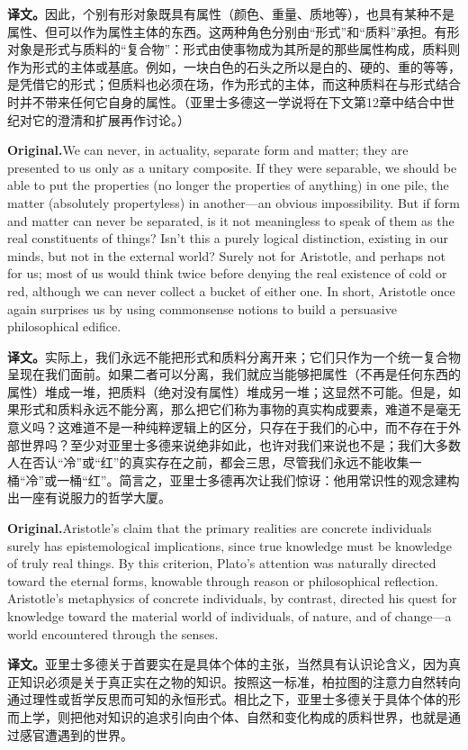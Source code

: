 \documentclass[UTF8]{ctexart}
\newcommand{\orig}{\par\noindent\textbf{Original.}\quad}
\newcommand{\zh}{\par\noindent\textbf{译文。}\quad}
\begin{document}
\zh 因此，个别有形对象既具有属性（颜色、重量、质地等），也具有某种不是属性、但可以作为属性主体的东西。这两种角色分别由“形式”和“质料”承担。有形对象是形式与质料的“复合物”：形式由使事物成为其所是的那些属性构成，质料则作为形式的主体或基底。例如，一块白色的石头之所以是白的、硬的、重的等等，是凭借它的形式；但质料也必须在场，作为形式的主体，而这种质料在与形式结合时并不带来任何它自身的属性。（亚里士多德这一学说将在下文第12章中结合中世纪对它的澄清和扩展再作讨论。）

\orig We can never, in actuality, separate form and matter; they are presented to us only as a unitary composite. If they were separable, we should be able to put the properties (no longer the properties of anything) in one pile, the matter (absolutely propertyless) in another---an obvious impossibility. But if form and matter can never be separated, is it not meaningless to speak of them as the real constituents of things? Isn't this a purely logical distinction, existing in our minds, but not in the external world? Surely not for Aristotle, and perhaps not for us; most of us would think twice before denying the real existence of cold or red, although we can never collect a bucket of either one. In short, Aristotle once again surprises us by using commonsense notions to build a persuasive philosophical edifice.

\zh 实际上，我们永远不能把形式和质料分离开来；它们只作为一个统一复合物呈现在我们面前。如果二者可以分离，我们就应当能够把属性（不再是任何东西的属性）堆成一堆，把质料（绝对没有属性）堆成另一堆；这显然不可能。但是，如果形式和质料永远不能分离，那么把它们称为事物的真实构成要素，难道不是毫无意义吗？这难道不是一种纯粹逻辑上的区分，只存在于我们的心中，而不存在于外部世界吗？至少对亚里士多德来说绝非如此，也许对我们来说也不是；我们大多数人在否认“冷”或“红”的真实存在之前，都会三思，尽管我们永远不能收集一桶“冷”或一桶“红”。简言之，亚里士多德再次让我们惊讶：他用常识性的观念建构出一座有说服力的哲学大厦。

\orig Aristotle's claim that the primary realities are concrete individuals surely has epistemological implications, since true knowledge must be knowledge of truly real things. By this criterion, Plato's attention was naturally directed toward the eternal forms, knowable through reason or philosophical reflection. Aristotle's metaphysics of concrete individuals, by contrast, directed his quest for knowledge toward the material world of individuals, of nature, and of change---a world encountered through the senses.

\zh 亚里士多德关于首要实在是具体个体的主张，当然具有认识论含义，因为真正知识必须是关于真正实在之物的知识。按照这一标准，柏拉图的注意力自然转向通过理性或哲学反思而可知的永恒形式。相比之下，亚里士多德关于具体个体的形而上学，则把他对知识的追求引向由个体、自然和变化构成的质料世界，也就是通过感官遭遇到的世界。
\end{document}

